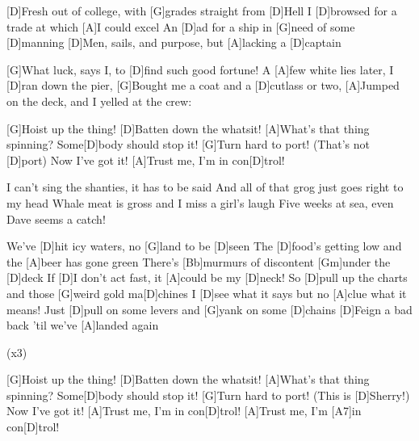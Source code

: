 

\begin{guitar}
	[D]Fresh out of college, with [G]grades straight from [D]Hell
	I [D]browsed for a trade at which [A]I could excel
	An [D]ad for a ship in [G]need of some [D]manning
	[D]Men, sails, and purpose, but [A]lacking a [D]captain
	
	[G]What luck, says I, to [D]find such good fortune!
	A [A]few white lies later, I [D]ran down the pier,
	[G]Bought me a coat and a [D]cutlass or two,
	[A]Jumped on the deck, and I yelled at the crew:
	
	[G]Hoist up the thing! [D]Batten down the whatsit!
	[A]What's that thing spinning? Some[D]body should stop it!
	[G]Turn hard to port! (That's not [D]port) Now I've got it!
	[A]Trust me, I'm in con[D]trol!
	
	I can't sing the shanties, it has to be said
	And all of that grog just goes right to my head
	Whale meat is gross and I miss a girl's laugh
	Five weeks at sea, even Dave seems a catch!
	
	 
	
	We've [D]hit icy waters, no [G]land to be [D]seen
	The [D]food's getting low and the [A]beer has gone green
	There's [Bb]murmurs of discontent [Gm]under the [D]deck
	If [D]I don't act fast, it [A]could be my [D]neck!
	\pagebreak
	So [D]pull up the charts and those [G]weird gold ma[D]chines
	I [D]see what it says but no [A]clue what it means!
	Just [D]pull on some levers and [G]yank on some [D]chains
	[D]Feign a bad back 'til we've [A]landed again
	
	  (x3)
	
	[G]Hoist up the thing! [D]Batten down the whatsit!
	[A]What's that thing spinning? Some[D]body should stop it!
	[G]Turn hard to port! (This is [D]Sherry!) Now I've got it!
	[A]Trust me, I'm in con[D]trol! 
	[A]Trust me, I'm [A7]in con[D]trol!
\end{guitar}